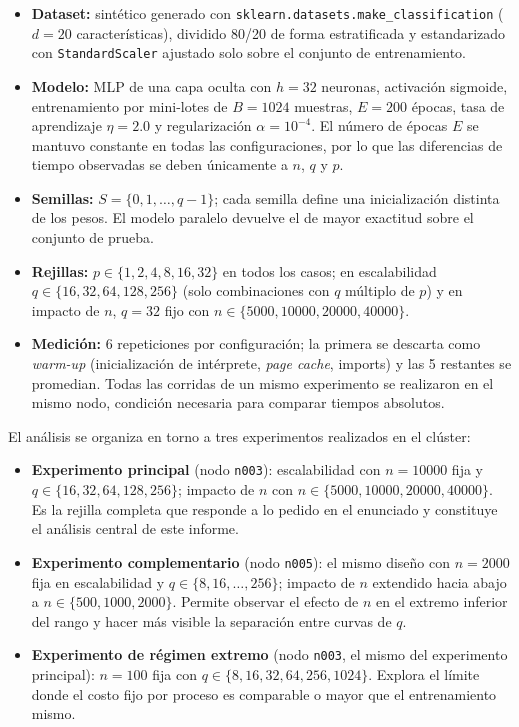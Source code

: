 \documentclass[11pt, a4paper]{article}
\begin{document}
\begin{itemize}
    \item \textbf{Dataset:} sintético generado con \texttt{sklearn.datasets.make\_classification} ($d = 20$ características), dividido 80/20 de forma estratificada y estandarizado con \texttt{StandardScaler} ajustado solo sobre el conjunto de entrenamiento.
    \item \textbf{Modelo:} MLP de una capa oculta con $h = 32$ neuronas, activación sigmoide, entrenamiento por mini-lotes de $B = 1024$ muestras, $E = 200$ épocas, tasa de aprendizaje $\eta = 2.0$ y regularización $\alpha = 10^{-4}$. El número de épocas $E$ se mantuvo constante en todas las configuraciones, por lo que las diferencias de tiempo observadas se deben únicamente a $n$, $q$ y $p$.
    \item \textbf{Semillas:} $S = \{0, 1, \dots, q-1\}$; cada semilla define una inicialización distinta de los pesos. El modelo paralelo devuelve el de mayor exactitud sobre el conjunto de prueba.
    \item \textbf{Rejillas:} $p \in \{1, 2, 4, 8, 16, 32\}$ en todos los casos; en escalabilidad $q \in \{16, 32, 64, 128, 256\}$ (solo combinaciones con $q$ múltiplo de $p$) y en impacto de $n$, $q = 32$ fijo con $n \in \{5000, 10000, 20000, 40000\}$.
    \item \textbf{Medición:} 6 repeticiones por configuración; la primera se descarta como \textit{warm-up} (inicialización de intérprete, \textit{page cache}, imports) y las 5 restantes se promedian. Todas las corridas de un mismo experimento se realizaron en el mismo nodo, condición necesaria para comparar tiempos absolutos.
\end{itemize}

El análisis se organiza en torno a tres experimentos realizados en el clúster:
\begin{itemize}
    \item \textbf{Experimento principal} (nodo \texttt{n003}): escalabilidad con $n = 10000$ fija y $q \in \{16, 32, 64, 128, 256\}$; impacto de $n$ con $n \in \{5000, 10000, 20000, 40000\}$. Es la rejilla completa que responde a lo pedido en el enunciado y constituye el análisis central de este informe.
    \item \textbf{Experimento complementario} (nodo \texttt{n005}): el mismo diseño con $n = 2000$ fija en escalabilidad y $q \in \{8, 16, \dots, 256\}$; impacto de $n$ extendido hacia abajo a $n \in \{500, 1000, 2000\}$. Permite observar el efecto de $n$ en el extremo inferior del rango y hacer más visible la separación entre curvas de $q$.
    \item \textbf{Experimento de régimen extremo} (nodo \texttt{n003}, el mismo del experimento principal): $n = 100$ fija con $q \in \{8, 16, 32, 64, 256, 1024\}$. Explora el límite donde el costo fijo por proceso es comparable o mayor que el entrenamiento mismo.
\end{itemize}
\end{document}
